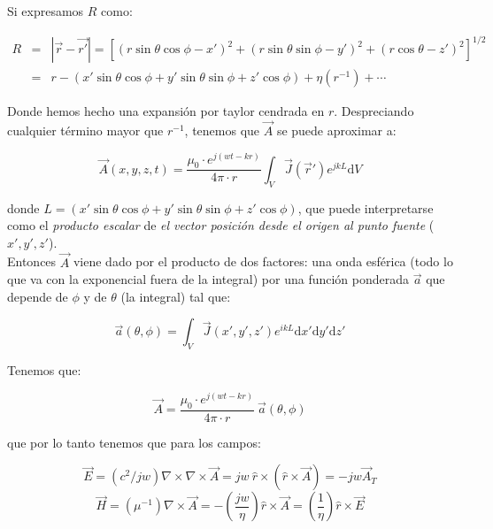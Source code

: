 \documentclass[12pt]{article}
\newcommand{\parentesis}[1]{\left( #1  \right)}
\newcommand{\D}{\mathrm{d}}
\newcommand{\rota}{\nabla \times}
\begin{document}
Si expresamos $R$ como:

$$ \begin{array}{lll} 
R & = & |\vec{r}-\vec{r'}| = [(r \sin \theta \cos \phi - x')^2 + (r \sin \theta \sin \phi - y')^2 + (r\cos\theta-z')^2]^{1/2}\\
 & = & r - (x' \sin \theta \cos \phi + y' \sin \theta \sin \phi + z' \cos \phi) + \eta(r^{-1}) + \cdots
\end{array}  $$

Donde hemos hecho una expansión por taylor cendrada en $r$. Despreciando cualquier término mayor que $r^{-1}$, tenemos que $\vec{A}$ se puede aproximar a:

\begin{equation}
\vec{A} (x,y,z,t) = \dfrac{\mu_0 \cdot e^{j(wt-kr)}}{4 \pi \cdot  r} \int_V \vec{J} (\vec{r}') e^{jkL} \D V
\end{equation} 

donde $L = (x' \sin \theta \cos \phi + y' \sin \theta \sin \phi + z' \cos \phi)$, que puede interpretarse como el \textit{producto escalar} de \textit{el vector posición desde el origen al punto fuente} ($x',y',z'$). \\
 
Entonces $\vec{A}$ viene dado por el producto de dos factores: una onda esférica (todo lo que va con la exponencial fuera de la integral) por una función ponderada $\vec{a}$ que depende de $\phi$ y de $\theta$  (la integral) tal que:

\begin{equation}
\vec{a} (\theta,\phi) = \int_V \vec{J} (x',y',z') e^{ikL} \D x' \D y' \D z'
\end{equation}

Tenemos que:

\begin{equation}
\vec{A} = \dfrac{\mu_0 \cdot e^{j(wt-kr)}}{4 \pi \cdot  r} \ \vec{a} (\theta,\phi)
\end{equation}

que por lo tanto tenemos que para los campos:

\begin{equation}
\vec{E} = (c^2/j w) \rota \rota \vec{A} = jw \ \hat{r} \times (\hat{r} \times \vec{A}) = - j w \vec{A}_T
\end{equation}
\begin{equation}
\vec{H} = (\mu^{-1}) \rota  \vec{A} = - \parentesis{\dfrac{jw}{\eta}} \hat{r} \times \vec{A} = \parentesis{\dfrac{1}{\eta}} \hat{r} \times \vec{E}
\end{equation}
\end{document}
